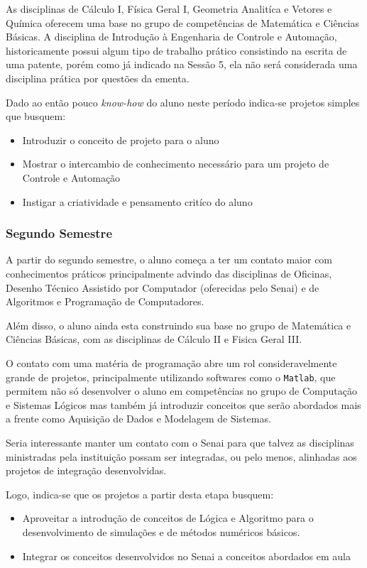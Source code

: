 \documentclass[12pt]{article} %
\begin{document}
As disciplinas de Cálculo I, Física Geral I, Geometria Analitíca e Vetores  e Química oferecem uma base no grupo de competências de Matemática e Ciências Básicas. A disciplina de Introdução à Engenharia de Controle e Automação, historicamente possui algum tipo de trabalho prático consistindo na escrita de uma patente, porém como já indicado na Sessão 5, ela não será considerada uma disciplina prática por questões da ementa.

Dado ao então pouco \textit{know-how} do aluno neste período indica-se projetos simples que busquem:
\begin{itemize}
\item Introduzir o conceito de projeto para o aluno
\item Mostrar o intercambio de conhecimento necessário para um projeto de Controle e Automação
\item Instigar a criatividade e pensamento critíco do aluno
\end{itemize}

\subsubsection{Segundo Semestre}
A partir do segundo semestre, o aluno começa a ter um contato maior com conhecimentos práticos principalmente advindo das disciplinas de Oficinas, Desenho Técnico Assistido por Computador (oferecidas pelo Senai) e de Algoritmos e Programação de Computadores.

Além disso, o aluno ainda esta construindo sua base no grupo de Matemática e Ciências Básicas, com as disciplinas de Cálculo II e Fisica Geral III.

O contato com uma matéria de programação abre um rol consideravelmente grande de projetos, principalmente utilizando softwares como o \texttt{Matlab}, que permitem não só desenvolver o aluno em competências no grupo de Computação e Sistemas Lógicos mas também já introduzir conceitos que serão abordados mais a frente como Aquisição de Dados e Modelagem de Sistemas.

Seria interessante manter um contato com o Senai para que talvez as disciplinas ministradas pela instituição possam ser integradas, ou pelo menos, alinhadas aos projetos de integração desenvolvidas.

Logo, indica-se que os projetos a partir desta etapa busquem:

\begin{itemize}
\item Aproveitar a introdução de conceitos de Lógica e Algoritmo para o desenvolvimento de simulações e de métodos numéricos básicos.
\item Integrar os conceitos desenvolvidos no Senai a conceitos abordados em aula 
\end{itemize}
\end{document}
